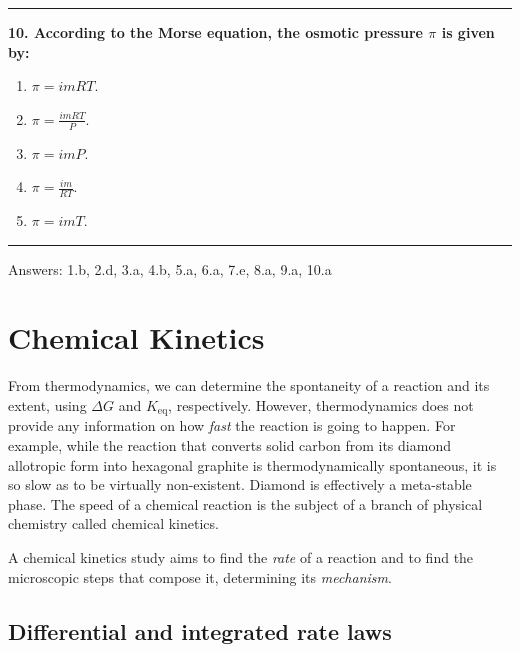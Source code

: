 \documentclass[
  9pt,
]{extbook}
\providecommand{\tightlist}{%
  \setlength{\itemsep}{0pt}\setlength{\parskip}{0pt}}
\theoremstyle{definition}
\theoremstyle{definition}
\theoremstyle{definition}
\theoremstyle{definition}
\theoremstyle{remark}
\begin{document}
\begin{center}\rule{0.5\linewidth}{0.5pt}\end{center}

\textbf{10. According to the Morse equation, the osmotic pressure \(\pi\) is given by:}

\begin{enumerate}
\def\labelenumi{\alph{enumi}.}
\tightlist
\item
  \(\pi = imRT\).
\item
  \(\pi = \frac{imRT}{P}\).
\item
  \(\pi = imP\).
\item
  \(\pi = \frac{im}{RT}\).
\item
  \(\pi = imT\).
\end{enumerate}

\begin{center}\rule{0.5\linewidth}{0.5pt}\end{center}

Answers: 1.b, 2.d, 3.a, 4.b, 5.a, 6.a, 7.e, 8.a, 9.a, 10.a

\chapter{Chemical Kinetics}\label{Kinetics}

From thermodynamics, we can determine the spontaneity of a reaction and its extent, using \(\Delta G\) and \(K_{\text{eq}}\), respectively. However, thermodynamics does not provide any information on how \emph{fast} the reaction is going to happen. For example, while the reaction that converts solid carbon from its diamond allotropic form into hexagonal graphite is thermodynamically spontaneous, it is so slow as to be virtually non-existent. Diamond is effectively a meta-stable phase. The speed of a chemical reaction is the subject of a branch of physical chemistry called chemical kinetics.

A chemical kinetics study aims to find the \emph{rate} of a reaction and to find the microscopic steps that compose it, determining its \emph{mechanism}.

\section{Differential and integrated rate laws}\label{diffintk}
\end{document}
